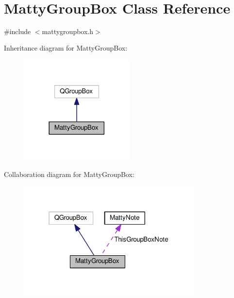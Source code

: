 \hypertarget{class_matty_group_box}{}\section{Matty\+Group\+Box Class Reference}
\label{class_matty_group_box}


{\ttfamily \#include $<$mattygroupbox.\+h$>$}



Inheritance diagram for Matty\+Group\+Box\+:
\nopagebreak
\begin{figure}[H]
\begin{center}
\leavevmode
\includegraphics[width=165pt]{class_matty_group_box__inherit__graph}
\end{center}
\end{figure}


Collaboration diagram for Matty\+Group\+Box\+:
\nopagebreak
\begin{figure}[H]
\begin{center}
\leavevmode
\includegraphics[width=265pt]{class_matty_group_box__coll__graph}
\end{center}
\end{figure}
